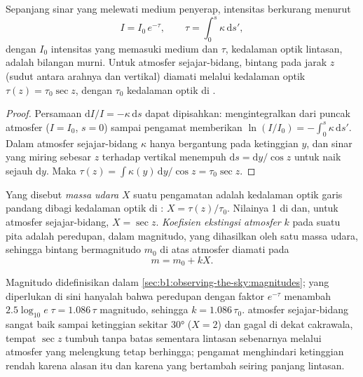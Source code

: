 \begin{proposition}\label{prop:b1:observing-the-sky:bouguer}
Sepanjang sinar yang melewati medium penyerap, intensitas berkurang menurut
\[
  I = I_0\,e^{-\tau}, \qquad \tau = \int_0^s \kappa\,\mathrm ds' ,
\]
dengan $I_0$ intensitas yang memasuki medium dan $\tau$, kedalaman optik lintasan, adalah bilangan murni.
Untuk atmosfer sejajar-bidang, bintang pada jarak  $z$ (sudut antara arahnya dan vertikal) diamati melalui kedalaman optik $\tau(z) = \tau_0\sec z$, dengan $\tau_0$ kedalaman optik di .
\end{proposition}

\begin{proof}
Persamaan $\mathrm dI/I = -\kappa\,\mathrm ds$ dapat dipisahkan: mengintegralkan dari puncak atmosfer ($I = I_0$, $s = 0$) sampai pengamat memberikan
$\ln(I/I_0) = -\int_0^s\kappa\,\mathrm ds'$. Dalam atmosfer sejajar-bidang $\kappa$ hanya bergantung pada ketinggian $y$, dan sinar yang miring sebesar $z$ terhadap vertikal menempuh $\mathrm ds = \mathrm dy/\cos z$ untuk naik sejauh $\mathrm dy$. Maka
$\tau(z) = \int \kappa(y)\,\mathrm dy/\cos z = \tau_0\sec z$.
\end{proof}

\begin{definition}\label{def:b1:observing-the-sky:extinction}
Yang disebut \emph{massa udara} $X$ suatu pengamatan adalah kedalaman optik garis pandang dibagi kedalaman optik di : $X = \tau(z)/\tau_0$. Nilainya 1 di  dan, untuk atmosfer sejajar-bidang, $X = \sec z$. \emph{Koefisien ekstingsi atmosfer} $k$ pada suatu pita adalah peredupan, dalam magnitudo, yang dihasilkan oleh satu massa udara, sehingga bintang bermagnitudo $m_0$ di atas atmosfer diamati pada
\[
  m = m_0 + kX .
\]
\end{definition}

Magnitudo didefinisikan dalam \cref{sec:b1:observing-the-sky:magnitudes}; yang diperlukan di sini hanyalah bahwa peredupan dengan faktor $e^{-\tau}$ menambah $2.5\log_{10}e\;\tau = 1.086\,\tau$ magnitudo, sehingga $k = 1.086\,\tau_0$.  atmosfer sejajar-bidang sangat baik sampai ketinggian sekitar \ang{30} ($X = 2$) dan gagal di dekat cakrawala, tempat $\sec z$ tumbuh tanpa batas sementara lintasan sebenarnya melalui atmosfer yang melengkung tetap berhingga; pengamat menghindari ketinggian rendah karena alasan itu dan karena  yang bertambah seiring panjang lintasan.

